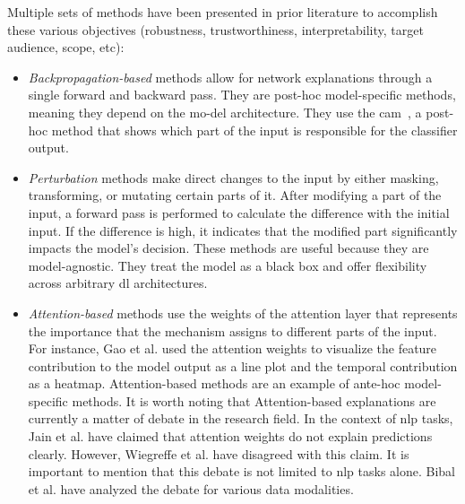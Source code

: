 Multiple sets of methods have been presented in prior literature to accomplish these various objectives (robustness, trustworthiness, interpretability, target audience, scope, etc):
\begin{itemize}
    \item \textit{Backpropagation-based} methods \cite{wang_time_2016, strodthoff_detecting_2019, siddiqui_tsviz_2019, ismail_fawaz_accurate_2019, oviedo_fast_2019, assaf_mtex-cnn_2019, munir_tsxplain_2019, cho_interpretation_2020, wolanin_estimating_2020, lauritsen_early_2020} allow for network explanations through a single forward and backward pass. They are post-hoc model-specific methods, meaning they depend on the mo-del architecture. They use the \gls{cam}~\cite{zhou_learning_2015}, a post-hoc method that shows which part of the input is responsible for the classifier output.
    \item \textit{Perturbation} methods \cite{kashiparekh_convtimenet_2019, guilleme_agnostic_2019, pan_series_2020, ismail_benchmarking_2020, crabbe_explaining_2021, zhao_explainable_2023, mujkanovic_timexplain_2023} make direct changes to the input by either masking, transforming, or mutating certain parts of it. After modifying a part of the input, a forward pass is performed to calculate the difference with the initial input. If the difference is high, it indicates that the modified part significantly impacts the model's decision. These methods are useful because they are model-agnostic. They treat the model as a black box and offer flexibility across arbitrary \gls{dl} architectures.
    \item \textit{Attention-based} methods \cite{vinayavekhin_focusing_2018, ge_interpretable_2018, karim_multivariate_2019, hao_new_2020, schockaert_attention_2020, siddiqui_tsinsight_2020, tan_monash_2020, lim_temporal_2020, choi_fully_2021, gao_explainable_2022} use the weights of the attention layer that represents the importance that the mechanism assigns to different parts of the input. For instance, Gao et al. \cite{gao_explainable_2022} used the attention weights to visualize the feature contribution to the model output as a line plot and the temporal contribution as a heatmap. Attention-based methods are an example of ante-hoc model-specific methods. 
    It is worth noting that Attention-based explanations are currently a matter of debate in the research field. In the context of \gls{nlp} tasks, Jain et al. \cite{jain_attention_2019} have claimed that attention weights do not explain predictions clearly. However, Wiegreffe et al. \cite{wiegreffe_attention_2019} have disagreed with this claim. It is important to mention that this debate is not limited to \gls{nlp} tasks alone. Bibal et al. \cite{bibal_is_2022} have analyzed the debate for various data modalities.

\end{itemize}
